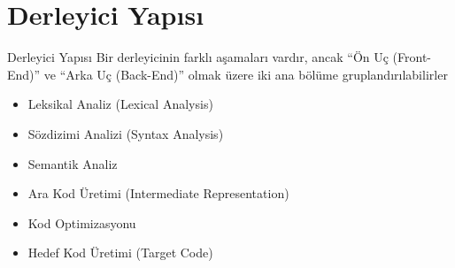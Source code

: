 \section{Derleyici Yapısı} %


\begin{frame}{Derleyici Yapısı}
Bir derleyicinin farklı aşamaları vardır, ancak “Ön Uç (Front-End)” ve “Arka Uç (Back-End)” olmak üzere iki ana bölüme gruplandırılabilirler
	\begin {itemize}
	    \item Leksikal Analiz (Lexical Analysis)
	    \item Sözdizimi Analizi (Syntax Analysis)
	    \item Semantik Analiz 
	    \item Ara Kod Üretimi (Intermediate Representation)
	    \item Kod Optimizasyonu
	    \item Hedef Kod Üretimi (Target Code)	    
	\end {itemize}	
\end{frame}

